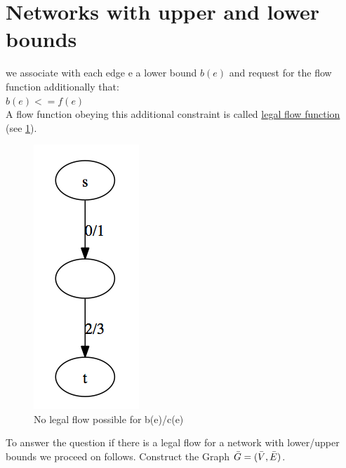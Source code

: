 \section{Networks with upper and lower bounds}

we associate with each edge e a lower bound $b(e)$ and request for the flow function additionally that:\\
$b(e) <= f(e)$\\
A flow function obeying this additional constraint is called \underline{legal flow function} (see \ref{fig:no_legal_flow}).

\begin{example}
\begin{figure}[t]
\centering
\includegraphics[scale=0.4]{diagrams/chapter_5_2_no_legal.png}
\caption{No legal flow possible for b(e)/c(e)}
\label{fig:no_legal_flow}
\end{figure}
\end{example}

To answer the question if there is a legal flow for a network with lower/upper bounds we proceed on follows. Construct the Graph $\Bar{G} = (\Bar{V},\Bar{E})$.

